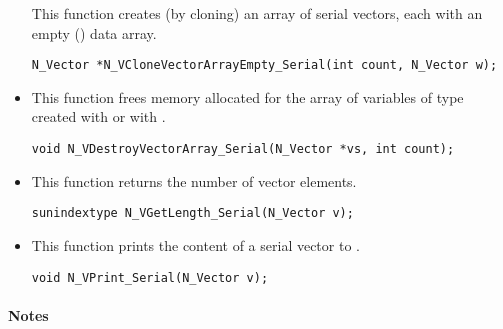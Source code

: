 \begin{itemize}
 This function creates (by cloning) an array of  serial vectors, each with an
 empty () data array.

 

 \verb|N_Vector *N_VCloneVectorArrayEmpty_Serial(int count, N_Vector w);|


\item {}

 This function frees memory allocated for the array of  variables of type
  created with  or with
 .

 

 \verb|void N_VDestroyVectorArray_Serial(N_Vector *vs, int count);|


\item {}

 This function returns the number of vector elements.

 
 
 \verb|sunindextype N_VGetLength_Serial(N_Vector v);|


\item {}

 This function prints the content of a serial vector to .

 
 
 \verb|void N_VPrint_Serial(N_Vector v);|

\end{itemize}
\paragraph{\bf Notes}                                                      
           
